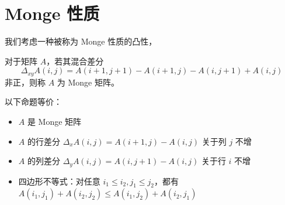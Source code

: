 \section{Monge 性质}

我们考虑一种被称为 Monge 性质的凸性，
\begin{definition}[Monge 矩阵]
    对于矩阵 $A$，若其混合差分
    $$
    \Delta_{xy}A(i,j)=A(i+1,j+1)-A(i+1,j)-A(i,j+1)+A(i,j)
    $$
    非正，则称 $A$ 为 Monge 矩阵。
\end{definition}

\begin{lemma}
    以下命题等价：
    \begin{itemize}
        \item $A$ 是 Monge 矩阵
        \item $A$ 的行差分 $\Delta_x A(i,j)=A(i+1,j)-A(i,j)$ 关于列 $j$ 不增
        \item $A$ 的列差分 $\Delta_y A(i,j)=A(i,j+1)-A(i,j)$ 关于行 $i$ 不增
        \item 四边形不等式：对任意 $i_1\le i_2,j_1\le j_2$，都有 $A(i_1,j_1)+A(i_2,j_2)\le A(i_1,j_2)+A(i_2,j_1)$
    \end{itemize}
\end{lemma}


